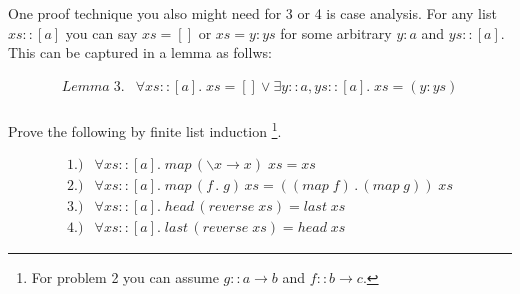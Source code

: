 \documentclass[11pt]{article}
\begin{document}
One proof technique you also might need for 3 or 4 is case analysis.  For any
list $xs :: [a]$ you can say $xs = []$ or $xs = y:ys$ for some arbitrary $y:a$
and $ys :: [a]$.  This can be captured in a lemma as follws:

\[\begin{array}{ll}
Lemma \;3. & \forall xs ::[a].\; xs= []  \vee \exists y:: a, ys::[a].\; xs = (y:ys)\\
\end{array}\]

Prove the following by finite list induction \footnote{For problem 2 you can assume
$g::a\rightarrow{}b$ and $f::b\rightarrow{}c$.}.

\[\begin{array}{ll}
1.) & \forall{}xs \!::\![a].\; map \,(\backslash x \rightarrow x)\; xs = xs \\
2.) & \forall{}xs \!::\![a].\; map \,(f\, .\; g)\, xs = ((map\; f)\, .\, (map\; g))\; xs\\
3.) & \forall{}xs \!::\![a].\; head\, (reverse \; xs) = last \; xs \\
4.) & \forall{}xs \!::\![a].\; last\, (reverse \; xs) = head \; xs
\end{array}
\]
\end{document}
